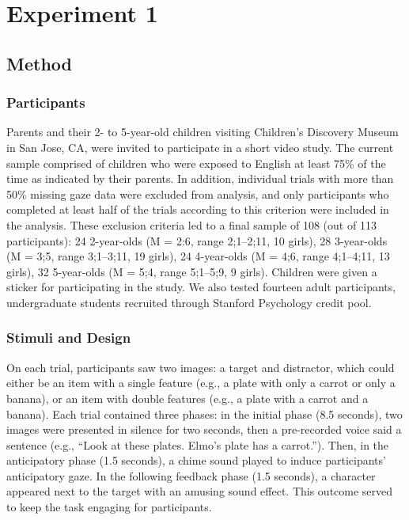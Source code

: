 \documentclass[10pt,letterpaper]{article}
\begin{document}
\section{Experiment 1}

\subsection{Method}

\subsubsection{Participants}

Parents and their 2- to 5-year-old children visiting Children's Discovery Museum in San Jose, CA, were invited to participate in a short video study. The current sample comprised of children who were exposed to English at least 75\% of the time as indicated by their parents. In addition, individual trials with more than 50\% missing gaze data were excluded from analysis, and only participants who completed at least half of the trials according to this criterion were included in the analysis. These exclusion criteria led to a final sample of 108 (out of 113 participants): 24 2-year-olds (M = 2:6, range 2;1--2;11, 10 girls), 28 3-year-olds (M = 3;5, range 3;1--3;11, 19 girls), 24 4-year-olds (M = 4;6, range 4;1--4;11, 13 girls), 32 5-year-olds (M = 5;4, range 5;1--5;9, 9 girls). Children were given a sticker for participating in the study. We also tested fourteen adult participants, undergraduate students recruited through Stanford Psychology credit pool. 

\subsubsection{Stimuli and Design}

On each trial, participants saw two images: a target and distractor, which could either be an item with a single feature (e.g., a plate with only a carrot or only a banana), or an item with double features (e.g., a plate with a carrot and a banana). Each trial contained three phases: in the initial phase (8.5 seconds), two images were presented in silence for two seconds, then a pre-recorded voice said a sentence (e.g., ``Look at these plates. Elmo's plate has a carrot.''). Then, in the anticipatory phase (1.5 seconds), a chime sound played to induce participants' anticipatory gaze. In the following feedback phase (1.5 seconds), a character appeared next to the target with an amusing sound effect. This outcome served to keep the task engaging for participants.
\end{document}
